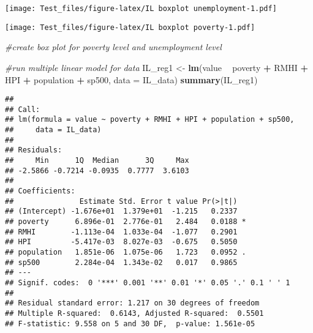 \documentclass[
]{article}
\newenvironment{Shaded}{\begin{snugshade}}{\end{snugshade}}
\newcommand{\CommentTok}[1]{\textcolor[rgb]{0.56,0.35,0.01}{\textit{#1}}}
\newcommand{\DataTypeTok}[1]{\textcolor[rgb]{0.13,0.29,0.53}{#1}}
\newcommand{\KeywordTok}[1]{\textcolor[rgb]{0.13,0.29,0.53}{\textbf{#1}}}
\newcommand{\NormalTok}[1]{#1}
\newcommand{\OperatorTok}[1]{\textcolor[rgb]{0.81,0.36,0.00}{\textbf{#1}}}
\newcommand{\StringTok}[1]{\textcolor[rgb]{0.31,0.60,0.02}{#1}}
\begin{document}
\texttt{[image: Test\_files/figure-latex/IL boxplot unemployment-1.pdf]}

\begin{Shaded}
\end{Shaded}

\texttt{[image: Test\_files/figure-latex/IL boxplot poverty-1.pdf]}

\begin{Shaded}
\begin{Highlighting}[]
\CommentTok{#create box plot for poverty level and unemployment level}
\end{Highlighting}
\end{Shaded}

\begin{Shaded}
\begin{Highlighting}[]
\CommentTok{#run multiple linear model for data}
\NormalTok{IL_reg1 <-}\StringTok{ }\KeywordTok{lm}\NormalTok{(value }\OperatorTok{~}\StringTok{ }\NormalTok{poverty }\OperatorTok{+}\StringTok{ }\NormalTok{RMHI }\OperatorTok{+}\StringTok{ }\NormalTok{HPI }\OperatorTok{+}\StringTok{ }\NormalTok{population }\OperatorTok{+}\StringTok{ }\NormalTok{sp500, }\DataTypeTok{data =}\NormalTok{ IL_data)}
\KeywordTok{summary}\NormalTok{(IL_reg1)}
\end{Highlighting}
\end{Shaded}

\begin{verbatim}
## 
## Call:
## lm(formula = value ~ poverty + RMHI + HPI + population + sp500, 
##     data = IL_data)
## 
## Residuals:
##     Min      1Q  Median      3Q     Max 
## -2.5866 -0.7214 -0.0935  0.7777  3.6103 
## 
## Coefficients:
##               Estimate Std. Error t value Pr(>|t|)  
## (Intercept) -1.676e+01  1.379e+01  -1.215   0.2337  
## poverty      6.896e-01  2.776e-01   2.484   0.0188 *
## RMHI        -1.113e-04  1.033e-04  -1.077   0.2901  
## HPI         -5.417e-03  8.027e-03  -0.675   0.5050  
## population   1.851e-06  1.075e-06   1.723   0.0952 .
## sp500        2.284e-04  1.343e-02   0.017   0.9865  
## ---
## Signif. codes:  0 '***' 0.001 '**' 0.01 '*' 0.05 '.' 0.1 ' ' 1
## 
## Residual standard error: 1.217 on 30 degrees of freedom
## Multiple R-squared:  0.6143, Adjusted R-squared:  0.5501 
## F-statistic: 9.558 on 5 and 30 DF,  p-value: 1.561e-05
\end{verbatim}
\end{document}

